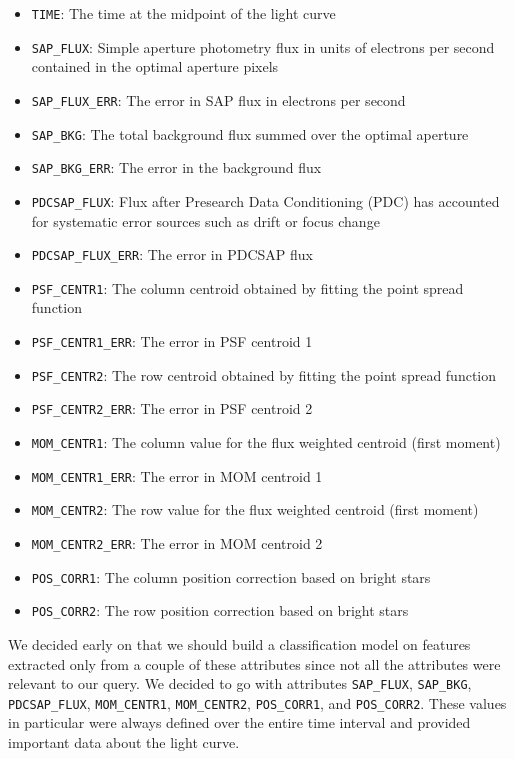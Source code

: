 \documentclass{amsart}
\begin{document}
\begin{itemize}
	\item \verb+TIME+: The time at the midpoint of the light curve
	\item \verb+SAP_FLUX+: Simple aperture photometry flux in units of electrons per second contained in the optimal aperture pixels
	\item \verb+SAP_FLUX_ERR+: The error in SAP flux in electrons per second
	\item \verb+SAP_BKG+: The total background flux summed over the optimal aperture
	\item \verb+SAP_BKG_ERR+: The error in the background flux
	\item \verb+PDCSAP_FLUX+: Flux after Presearch Data Conditioning (PDC) has accounted for systematic error sources such as drift or focus change
	\item \verb+PDCSAP_FLUX_ERR+: The error in PDCSAP flux
	\item \verb+PSF_CENTR1+: The column centroid obtained by fitting the point spread function
	\item \verb+PSF_CENTR1_ERR+: The error in PSF centroid 1
	\item \verb+PSF_CENTR2+: The row centroid obtained by fitting the point spread function
	\item \verb+PSF_CENTR2_ERR+: The error in PSF centroid 2
	\item \verb+MOM_CENTR1+: The column value for the flux weighted centroid (first moment)
	\item \verb+MOM_CENTR1_ERR+: The error in MOM centroid 1
	\item \verb+MOM_CENTR2+: The row value for the flux weighted centroid (first moment)
	\item \verb+MOM_CENTR2_ERR+: The error in MOM centroid 2
	\item \verb+POS_CORR1+: The column position correction based on bright stars 
	\item \verb+POS_CORR2+: The row position correction based on bright stars
\end{itemize}

We decided early on that we should build a classification model on features extracted only from a couple of these attributes since not all the attributes were relevant to our query. We decided to go with attributes \verb+SAP_FLUX+, \verb+SAP_BKG+, \verb+PDCSAP_FLUX+, \verb+MOM_CENTR1+, \verb+MOM_CENTR2+, \verb+POS_CORR1+, and \verb+POS_CORR2+. These values in particular were always defined over the entire time interval and provided important data about the light curve. 
\end{document}

